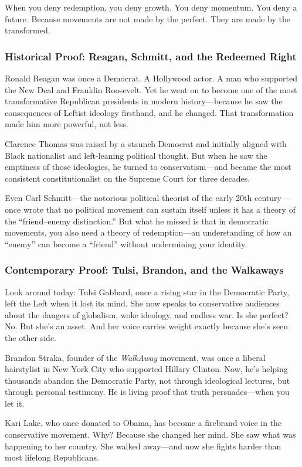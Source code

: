 When you deny redemption, you deny growth. You deny momentum. You deny a future. Because movements are not made by the perfect. They are made by the transformed.

\subsubsection*{Historical Proof: Reagan, Schmitt, and the Redeemed Right}
Ronald Reagan was once a Democrat. A Hollywood actor. A man who supported the New Deal and Franklin Roosevelt. Yet he went on to become one of the most transformative Republican presidents in modern history—because he saw the consequences of Leftist ideology firsthand, and he changed. That transformation made him more powerful, not less.

Clarence Thomas was raised by a staunch Democrat and initially aligned with Black nationalist and left-leaning political thought. But when he saw the emptiness of those ideologies, he turned to conservatism—and became the most consistent constitutionalist on the Supreme Court for three decades.

Even Carl Schmitt—the notorious political theorist of the early 20th century—once wrote that no political movement can sustain itself unless it has a theory of the “friend–enemy distinction.” But what he missed is that in democratic movements, you also need a theory of redemption—an understanding of how an “enemy” can become a “friend” without undermining your identity.

\subsubsection*{Contemporary Proof: Tulsi, Brandon, and the Walkaways}
Look around today: Tulsi Gabbard, once a rising star in the Democratic Party, left the Left when it lost its mind. She now speaks to conservative audiences about the dangers of globalism, woke ideology, and endless war. Is she perfect? No. But she’s an asset. And her voice carries weight exactly because she’s seen the other side.

Brandon Straka, founder of the \textit{WalkAway} movement, was once a liberal hairstylist in New York City who supported Hillary Clinton. Now, he's helping thousands abandon the Democratic Party, not through ideological lectures, but through personal testimony. He is living proof that truth persuades—when you let it.

Kari Lake, who once donated to Obama, has become a firebrand voice in the conservative movement. Why? Because she changed her mind. She saw what was happening to her country. She walked away—and now she fights harder than most lifelong Republicans.

